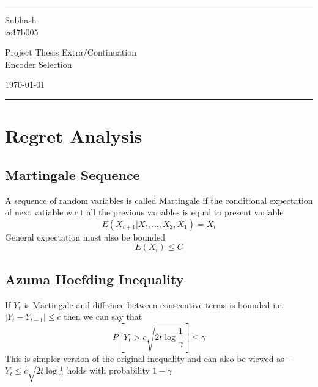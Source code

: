 \documentclass[a4paper]{article}
\begin{document}

\fancyhead[C]{}
\hrule \medskip %
\begin{minipage}{0.295\textwidth} 
\raggedright
\footnotesize
Subhash \hfill\\   
cs17b005 \hfill\\

\end{minipage}
\begin{minipage}{0.4\textwidth} 
\centering 
\large 
Project Thesis Extra/Continuation\\ 
\normalsize 
Encoder Selection\\ 
\end{minipage}
\begin{minipage}{0.295\textwidth} 
\raggedleft
\today\hfill\\
\end{minipage}
\medskip\hrule 
\bigskip


\section{Regret Analysis}

\subsection{Martingale Sequence}
A sequence of random variables is called Martingale if the conditional expectation of next vatiable w.r.t all the previous variables is equal to present variable 
$$ E(X_{t+1}|X_t,...,X_2,X_1) = X_t $$
General expectation must also be bounded 
$$ E(X_i) \leq C $$

\subsection{Azuma Hoefding Inequality}
If $Y_t$ is Martingale and diffrence between consecutive terms is bounded i.e. $|Y_t - Y_{t-1}| \leq c$ then we can say that
\begin{equation}
    P{\left[Y_t > c\sqrt{2t\log{\frac{1}{\gamma}}}\right]} \leq \gamma
\end{equation}
This is simpler version of the original inequality and can also be viewed as - 
$ Y_t \leq c\sqrt{2t\log{\frac{1}{\gamma}}} $ holds with probability $ 1-\gamma $
\end{document}
